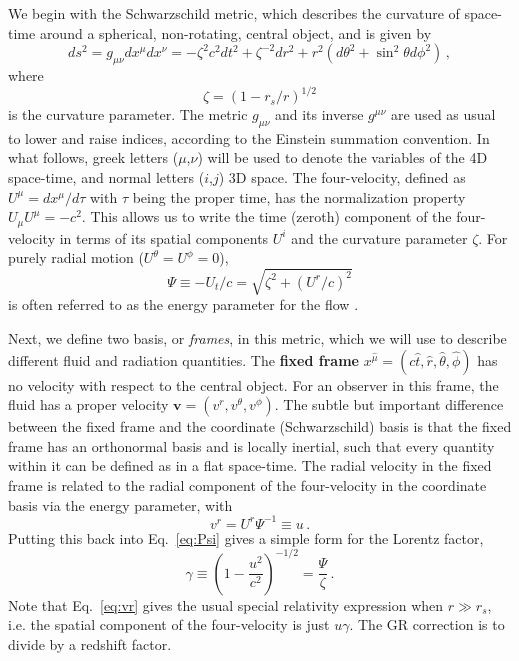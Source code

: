 \documentclass[../main.tex]{subfiles}
\begin{document}
We begin with the Schwarzschild metric, which describes the curvature of space-time around a spherical, non-rotating, central object, and is given by
\begin{equation}
ds^2=g_{\mu\nu}dx^\mu dx^\nu=-\zeta^2 c^2dt^2+\zeta^{-2}dr^2 +r^2(d\theta^2+\sin^2\theta d\phi^2)\,,
\end{equation}
where
\begin{equation}\label{eq:zeta}
    \zeta=(1-r_s/r)^{1/2}
\end{equation}
is the curvature parameter. The metric $g_{\mu\nu}$ and its inverse $g^{\mu\nu}$ are used as usual to lower and raise indices, according to the Einstein summation convention.  In what follows, greek letters ($\mu$,$\nu$) will be used to denote the variables of the 4D space-time, and normal letters ($i$,$j$) 3D space.  The four-velocity, defined as $U^\mu=dx^\mu/d\tau$ with $\tau$ being the proper time, has the normalization property $U_\mu U^\mu=-c^2$.  This allows us to write the time (zeroth) component of the four-velocity in terms of its spatial components $U^i$ and the curvature parameter $\zeta$.  For purely radial motion ($U^\theta=U^\phi=0$),
\begin{equation}\label{eq:Psi}
    \Psi\equiv -U_t/c=\sqrt{\zeta^2+(U^r/c)^2}
\end{equation}
is often referred to as the energy parameter for the flow \citep{Thorne1981}. 

Next, we define two basis, or \textit{frames}, in this metric, which we will use to describe different fluid and radiation quantities.  The \textbf{fixed frame} $x^{\hat{\mu}}=(c\hat{t},\hat{r},\hat{\theta},\hat{\phi})$ has no velocity with respect to the central object.  For an observer in this frame, the fluid has a proper velocity $\bm{v}=(v^r,v^\theta,v^\phi)$.  The subtle but important difference between the fixed frame and the coordinate (Schwarzschild) basis is that the fixed frame has an orthonormal basis and is locally inertial, such that every quantity within it can be defined as in a flat space-time. The radial velocity in the fixed frame is related to the radial component of the four-velocity in the coordinate basis via the energy parameter, with
\begin{equation}\label{eq:vr}
    v^r=U^r\Psi^{-1}\equiv u\, .
\end{equation}
Putting this back into Eq.~\eqref{eq:Psi} gives a simple form for the Lorentz factor,
\begin{equation}\label{eq:gamma}
\gamma\equiv\left(1-\frac{u^2}{c^2}\right)^{-1/2}=\frac{\Psi}{\zeta} \,.
\end{equation}
Note that Eq.~\eqref{eq:vr} gives the usual special relativity expression when $r\gg r_s$, i.e. the spatial component of the four-velocity is just $u\gamma$. The GR correction is to divide by a redshift factor.
\end{document}
